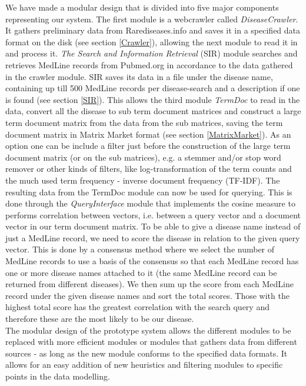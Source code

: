 We have made a modular design that is divided into five major
components representing our system. The first module is a webcrawler
called \textit{DiseaseCrawler}. It gathers preliminary data from
Rarediseases.info and saves it in a specified data format on the disk
(see section \ref{Crawler}), allowing the next module to read it in
and process it. \textit{The Search and Information Retrieval} (SIR)
module searches and retrieves MedLine records from Pubmed.org in
accordance to the data gathered in the crawler module. SIR saves its
data in a file under the disease name, containing up till 500 MedLine
records per disease-search and a description if one is found (see
section \ref{SIR}). This allows the third module \textit{TermDoc} to
read in the data, convert all the disease to sub term document
matrices and construct a large term document matrix from the data from
the sub matrices, saving the term document matrix in Matrix Market
format (see section \ref{MatrixMarket}). As an option one can be include a filter
just before the construction of the large term document matrix (or on
the sub matrices), e.g. a stemmer and/or stop word remover or other
kinds of filters, like log-transformation of the term counts and the
much used term frequency - inverse document frequency (TF-IDF). The
resulting data from the TermDoc module can now be used for
querying. This is done through the \textit{QueryInterface} module that
implements the cosine measure to performs correlation between vectors,
i.e. between a query vector and a document vector in our term document
matrix. To be able to give a disease name instead of just a MedLine
record, we need to score the disease in relation to the given query
vector. This is done by a consensus method where we select the number
of MedLine records to use a basis of the consensus so that each
MedLine record has one or more disease names attached to it (the same
MedLine record can be returned from different diseases). We then sum
up the score from each MedLine record under the given disease names
and sort the total scores. Those with the highest total score has the
greatest correlation with the search query and therefore these are the
most likely to be our disease.\\

The modular design of the prototype system allows the different
modules to be replaced with more efficient modules or modules that
gathers data from different sources - as long as the new module
conforms to the specified data formats. It allows for an easy addition
of new heuristics and filtering modules to specific points in the data
modelling.

